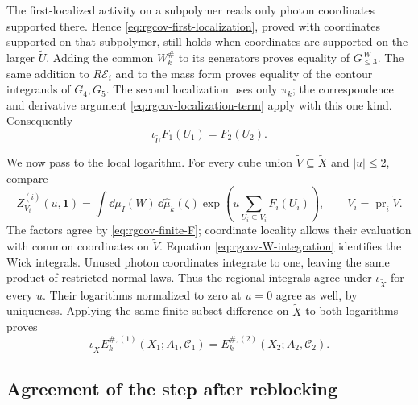 The first-localized activity on a subpolymer reads
only photon coordinates supported there. Hence
\eqref{eq:rgcov-first-localization}, proved with coordinates
supported on that subpolymer, still holds when coordinates
are supported on the larger $\widetilde U$.
Adding the common $W_k^\#$ to its generators proves
equality of $G_{\le3}^{\,W}$.
The same addition to $R\mathscr E_i$ and to the mass
form proves equality of the contour integrands of
$G_4,G_5$. The second localization uses only $\pi_k$;
the correspondence and derivative argument
\eqref{eq:rgcov-localization-term} apply with this
one kind. Consequently
\begin{equation}\label{eq:rgcov-finite-F}
                       \iota_{\widetilde U}F_1(U_1)=F_2(U_2).
\end{equation}

We now pass to the local logarithm. For every cube union
$\widetilde V\subseteq\widetilde X$ and $|u|\le2$, compare
\[
 Z_{V_i}^{(i)}(u,\mathbf1)
  =\int\dd\mu_I(W)\,\dd\widehat\mu_k(\zeta)
                  \exp\left(u\sum_{U_i\subseteq V_i}F_i(U_i)\right),
 \qquad V_i=\operatorname{pr}_i\widetilde V.
\]
The factors agree by \eqref{eq:rgcov-finite-F}; coordinate locality
allows their evaluation with common coordinates on $\widetilde V$.
Equation \eqref{eq:rgcov-W-integration} identifies the Wick integrals.
Unused photon coordinates integrate to one, leaving the same
product of restricted normal laws. Thus the regional integrals
agree under $\iota_{\widetilde X}$ for every $u$.
Their logarithms normalized to zero at $u=0$ agree as well,
by uniqueness. Applying the same finite subset difference on
$\widetilde X$ to both logarithms proves
\begin{equation}\label{eq:rgcov-logarithm-agreement}
       \iota_{\widetilde X}E_k^{\#,(1)}(X_1;A_1,\mathscr C_1)
                      =E_k^{\#,(2)}(X_2;A_2,\mathscr C_2).
\end{equation}

\subsection{Agreement of the step after reblocking}
\label{subsec:rgcov-step-comparison}



